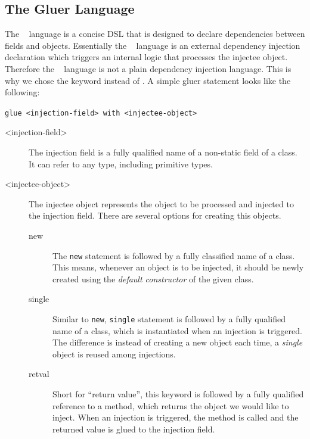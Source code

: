 \documentclass{llncs}
\begin{document}
\subsection{The Gluer Language}
The \gluer~ language is a concise DSL that is designed to declare dependencies between fields and objects. Essentially the \gluer~ language is an external dependency injection declaration which triggers an internal logic that processes the injectee object. Therefore the \gluer~ language is not a plain dependency injection language. This is why we chose the keyword  instead of . A simple gluer statement looks like the following:

\lstinline~glue <injection-field> with <injectee-object>~

\begin{description}
\item[<injection-field>] The injection field is a fully qualified name of a non-static field of a class. It can refer to any type, including primitive types. 
\end{description}

\begin{description}
\item[<injectee-object>] The injectee object represents the object to be processed and injected to the injection field. There are several options for creating this objects.
	\begin{description}
	\item[new] The \lstinline{new} statement is followed by a fully classified name of a class. This means, whenever an object is to be injected, it should be newly created using the \emph{default constructor} of the given class. 

	\item[single] Similar to \lstinline{new}, \lstinline{single} statement is followed by a fully qualified name of a class, which is instantiated when an injection is triggered. The difference is instead of creating a new object each time, a \emph{single} object is reused among injections.

	\item[retval] Short for ``return value'', this keyword is followed by a fully qualified reference to a method, which returns the object we would like to inject. When an injection is triggered, the method is called and the returned value is glued to the injection field.
	\end{description}
\end{description}
\end{document}
